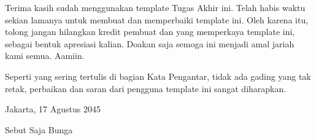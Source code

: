 Terima kasih sudah menggunakan template Tugas Akhir ini. Telah habis waktu sekian lamanya untuk membuat dan memperbaiki template ini. Oleh karena itu, tolong jangan hilangkan kredit pembuat dan yang memperkaya template ini, sebagai bentuk apresiasi kalian. Doakan saja semoga ini menjadi amal jariah kami semua. Aamiin.

Seperti yang sering tertulis di bagian Kata Pengantar, tidak ada gading yang tak retak, perbaikan dan saran dari pengguna template ini sangat diharapkan.

	\vskip 3cm
	\hspace{10cm} Jakarta, 17 Agustus 2045 \par
	\vskip 3cm
	\hspace{10cm} Sebut Saja Bunga
